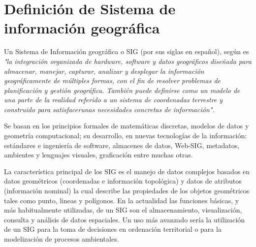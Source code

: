 \section{Definición de Sistema de información geográfica}
\label{sec:cap2-definicion-sig}

Un Sistema de Información geográfica o SIG (por sus siglas en español), según \cite{lopezMarcos2007} es 
\textit{"la integración organizada de hardware, software y datos geográficos diseñada para almacenar, manejar,
capturar, analizar y desplegar la información geográficamente de múltiples formas, con el fin de resolver problemas
de planificación y gestión geográfica. También puede definirse como un modelo de una parte de la realidad referido
a un sistema de coordenadas terrestre y construido para satisfacerunas necesidades concretas de información"}.

Se basan en los principios formales de matemáticas discretas, modelos de datos y geometría computacional; su
desarrollo, en nuevas tecnologías de la información: estándares e ingeniería de software, almacenes de datos, 
Web-SIG, metadatos, ambientes y lenguajes visuales, graficación entre muchas otras\cite{lunaPaulina2010}.

La característica principal de los SIG es el manejo de datos complejos basados en datos geométricos (coordenadas e
información topológica) y datos de atributos (información nominal) la cual describe las propiedades de los objetos
geométricos tales como punto, lineas y polígonos. En la actualidad las funciones básicas, y más habitualmente
utilizadas, de un SIG son el almacenamiento, visualización, consulta y análisis de datos espaciales. Un uso
más avanzado sería la utilización de un SIG para la toma de decisiones en ordenación territorial o para la
modelización de procesos ambientales.

